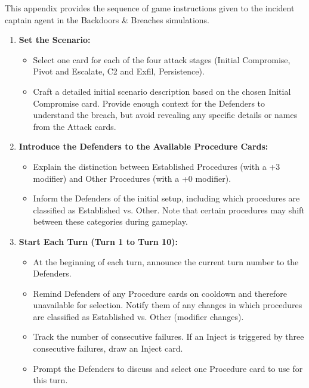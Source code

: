 \documentclass[letterpaper]{article} %
\begin{document}
This appendix provides the sequence of game instructions given to the incident captain agent in the Backdoors \& Breaches simulations.

\begin{enumerate}
    \item \textbf{Set the Scenario:}
    \begin{itemize}
        \item Select one card for each of the four attack stages (Initial Compromise, Pivot and Escalate, C2 and Exfil, Persistence).
        \item Craft a detailed initial scenario description based on the chosen Initial Compromise card. Provide enough context for the Defenders to understand the breach, but avoid revealing any specific details or names from the Attack cards.
    \end{itemize}

    \item \textbf{Introduce the Defenders to the Available Procedure Cards:}
    \begin{itemize}
        \item Explain the distinction between Established Procedures (with a +3 modifier) and Other Procedures (with a +0 modifier).
        \item Inform the Defenders of the initial setup, including which procedures are classified as Established vs. Other. Note that certain procedures may shift between these categories during gameplay.
    \end{itemize}

    \item \textbf{Start Each Turn (Turn 1 to Turn 10):}
    \begin{itemize}
        \item At the beginning of each turn, announce the current turn number to the Defenders.
        \item Remind Defenders of any Procedure cards on cooldown and therefore unavailable for selection. Notify them of any changes in which procedures are classified as Established vs. Other (modifier changes).
        \item Track the number of consecutive failures. If an Inject is triggered by three consecutive failures, draw an Inject card.
        \item Prompt the Defenders to discuss and select one Procedure card to use for this turn.
    \end{itemize}


\end{enumerate}
\end{document}
